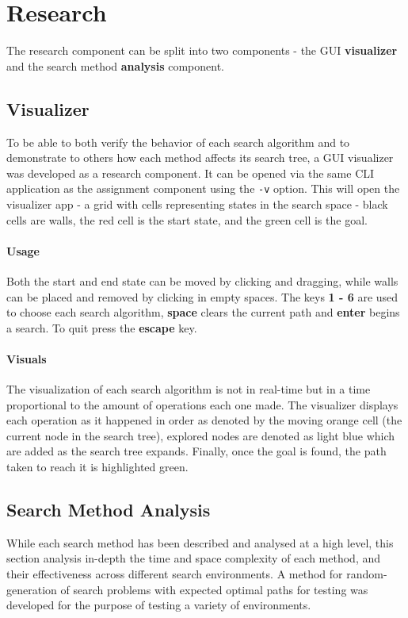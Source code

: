 \section{Research} %
\label{sec:research}
The research component can be split into two components - the GUI \textbf{visualizer} and the search method \textbf{analysis} component.

\subsection{Visualizer} %
\label{sub:visualizer}
To be able to both verify the behavior of each search algorithm and to demonstrate to others how each method affects its search tree, a GUI visualizer was developed as a research component. It can be opened via the same CLI application as the assignment component using the \texttt{-v} option. This will open the visualizer app - a grid with cells representing states in the search space - black cells are walls, the red cell is the start state, and the green cell is the goal.

\paragraph{Usage} %
\label{par:usage}
Both the start and end state can be moved by clicking and dragging, while walls can be placed and removed by clicking in empty spaces. The keys \textbf{1 - 6} are used to choose each search algorithm, \textbf{space} clears the current path and \textbf{enter} begins a search. To quit press the \textbf{escape} key.

\paragraph{Visuals} %
\label{par:visuals}
The visualization of each search algorithm is not in real-time but in a time proportional to the amount of operations each one made. The visualizer displays each operation as it happened in order as denoted by the moving orange cell (the current node in the search tree), explored nodes are denoted as light blue which are added as the search tree expands. Finally, once the goal is found, the path taken to reach it is highlighted green.


\subsection{Search Method Analysis} %
\label{sub:search_method_analysis}
While each search method has been described and analysed at a high level, this section analysis in-depth the time and space complexity of each method, and their effectiveness across different search environments. A method for random-generation of search problems with expected optimal paths for testing was developed for the purpose of testing a variety of environments.

